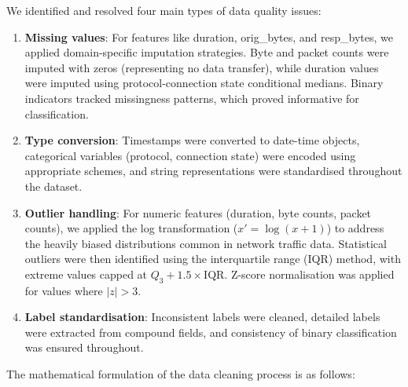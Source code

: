 We identified and resolved four main types of data quality issues:

\begin{enumerate}
    \item \textbf{Missing values}: For features like duration, orig\_bytes, and resp\_bytes, we applied domain-specific imputation strategies. Byte and packet counts were imputed with zeros (representing no data transfer), while duration values were imputed using protocol-connection state conditional medians. Binary indicators tracked missingness patterns, which proved informative for classification.
    
    \item \textbf{Type conversion}: Timestamps were converted to date-time objects, categorical variables (protocol, connection state) were encoded using appropriate schemes, and string representations were standardised throughout the dataset.
    
    \item \textbf{Outlier handling}: For numeric features (duration, byte counts, packet counts), we applied the log transformation ($x' = \log(x + 1)$) to address the heavily biased distributions common in network traffic data. Statistical outliers were then identified using the interquartile range (IQR) method, with extreme values capped at $Q_3 + 1.5 \times \text{IQR}$. Z-score normalisation was applied for values where $|z| > 3$.
    
    \item \textbf{Label standardisation}: Inconsistent labels were cleaned, detailed labels were extracted from compound fields, and consistency of binary classification was ensured throughout.
\end{enumerate}

The mathematical formulation of the data cleaning process is as follows:

